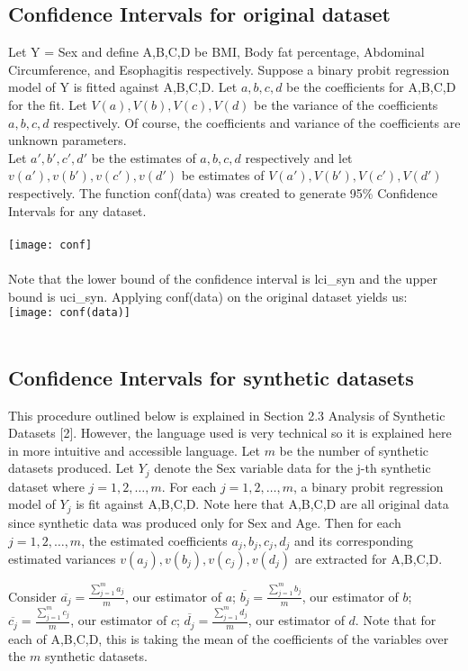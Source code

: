 \documentclass[12pt]{article}
\begin{document}
\subsection*{Confidence Intervals for original dataset}
Let Y = Sex and define A,B,C,D be BMI, Body fat percentage, Abdominal Circumference, and Esophagitis respectively. Suppose a binary probit regression model of Y is fitted against A,B,C,D. Let $a,b,c,d$ be the coefficients for A,B,C,D for the fit. Let $V(a),V(b),V(c),V(d)$ be the variance of the coefficients $a,b,c,d$ respectively. Of course, the coefficients and variance of the coefficients are unknown parameters.\\
Let $a',b',c',d'$ be the estimates of $a,b,c,d$ respectively and let $v(a'),v(b'),v(c'),v(d')$ be estimates of $V(a'),V(b'),V(c'),V(d')$ respectively. The function conf(data) was created to generate 95\% Confidence Intervals for any dataset.\\\\
\texttt{[image: conf]}\\\\
Note that the lower bound of the confidence interval is lci\_syn and the upper bound is uci\_syn. Applying conf(data) on the original dataset yields us:\\
\texttt{[image: conf(data)]}\\\\

\subsection*{Confidence Intervals for synthetic datasets}
This procedure outlined below is explained in Section 2.3 Analysis of Synthetic Datasets [2]. However, the language used is very technical so it is explained here in more intuitive and accessible language.
Let $m$ be the number of synthetic datasets produced.
Let $Y_j$ denote the Sex variable data for the j-th synthetic dataset where $j = 1,2,\dots, m$. For each $j = 1,2,\dots, m$, a binary probit regression model of $Y_j$ is fit against A,B,C,D. Note here that A,B,C,D are all original data since synthetic data was produced only for Sex and Age. Then for each $j = 1,2,\dots, m$, the estimated coefficients $a_j,b_j,c_j,d_j$ and its corresponding estimated variances $v(a_j),v(b_j),v(c_j),v(d_j)$ are extracted for A,B,C,D. 

Consider $\overline{a_j} = \frac{\sum_{j=1}^{m} a_j}{m}$, our estimator of $a$; $\overline{b_j} = \frac{\sum_{j=1}^{m} b_j}{m}$, our estimator of $b$; $\overline{c_j} = \frac{\sum_{j=1}^{m} c_j}{m}$, our estimator of $c$; $\overline{d_j} = \frac{\sum_{j=1}^{m} d_j}{m}$, our estimator of $d$. Note that for each of A,B,C,D, this is taking the mean of the coefficients of the variables over the $m$ synthetic datasets. 
\end{document}
